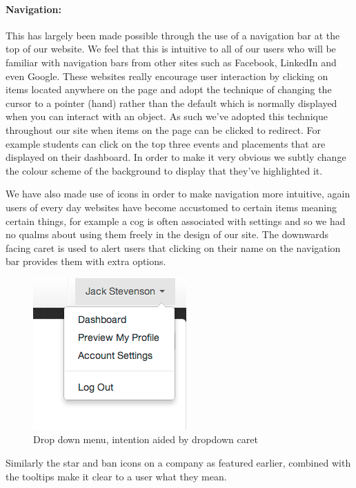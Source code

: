     \paragraph{Navigation:} This has largely been made possible through the use of a navigation bar at the top of our website. We feel that this is intuitive to all of our users who will be familiar with navigation bars from other sites such as Facebook\cite{facebook}, LinkedIn\cite{linkedin} and even Google\cite{google}. These websites really encourage user interaction by clicking on items located anywhere on the page and adopt the technique of changing the cursor to a pointer (hand) rather than the default which is normally displayed when you can interact with an object. As such we've adopted this technique throughout our site when items on the page can be clicked to redirect. For example students can click on the top three events and placements that are displayed on their dashboard. In order to make it very obvious we subtly change the colour scheme of the background to display that they've highlighted it.

    We have also made use of icons in order to make navigation more intuitive, again users of every day websites have become accustomed to certain items meaning certain things, for example a cog is often associated with settings and so we had no qualms about using them freely in the design of our site.
    The downwards facing caret is used to alert users that clicking on their name on the navigation bar provides them with extra options.
    
    \begin{figure}[H]\centering
    \includegraphics[scale=0.5]{images/design/navigation_caret}
    \caption{Drop down menu, intention aided by dropdown caret}
    \end{figure}

    Similarly the star and ban icons on a company as featured earlier, combined with the tooltips make it clear to a user what they mean.

